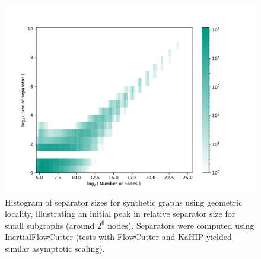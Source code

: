 \begin{figure}[tbhp]
	\centering
	\includegraphics[width=0.6\linewidth]{graphics/local_embedding-hist.pdf}
	\caption{Histogram of separator sizes for synthetic graphs using geometric locality, illustrating an initial peak in relative separator size for small subgraphs (around \(2^6\) nodes). Separators were computed using InertialFlowCutter (tests with FlowCutter and KaHIP yielded similar asymptotic scaling).}
	\label{fig:local_embedding_hist_deviation}
\end{figure}




